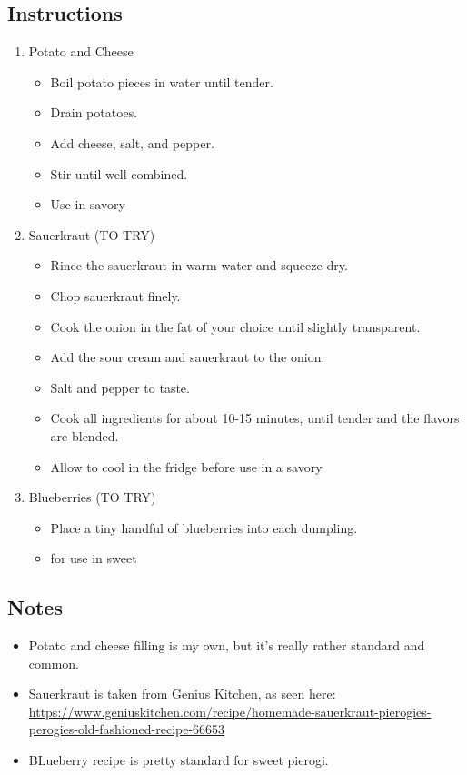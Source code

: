 \begin{multicols}{2}
\subsection*{Instructions}
\begin{enumerate}
    \item Potato and Cheese
    \begin{itemize}
        \item Boil potato pieces in water until tender.
        \item Drain potatoes.
        \item Add cheese, salt, and pepper.
        \item Stir until well combined.
        \item Use in savory 
    \end{itemize}
    \item Sauerkraut (TO TRY)
    \begin{itemize}
        \item Rince the sauerkraut in warm water and squeeze dry.
        \item Chop sauerkraut finely.
        \item Cook the onion in the fat of your choice until slightly transparent.
        \item Add the sour cream and sauerkraut to the onion.
        \item Salt and pepper to taste.
        \item Cook all ingredients for about 10-15 minutes, until tender and the flavors are blended.
        \item Allow to cool in the fridge before use in a savory 
    \end{itemize}
    \item Blueberries (TO TRY)
    \begin{itemize}
        \item Place a tiny handful of blueberries into each dumpling.
        \item for use in sweet 
    \end{itemize}
\end{enumerate}

\subsection*{Notes}
\begin{itemize}
    \item Potato and cheese filling is my own, but it's really rather standard and common.
    \item Sauerkraut is taken from Genius Kitchen, as seen here: \url{https://www.geniuskitchen.com/recipe/homemade-sauerkraut-pierogies-perogies-old-fashioned-recipe-66653}
    \item BLueberry recipe is pretty standard for sweet pierogi.
\end{itemize}
\end{multicols}
\clearpage